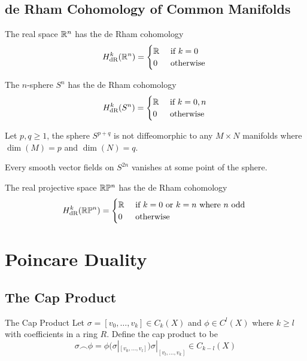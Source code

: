 \documentclass[a4paper]{article}
\begin{document}
\subsection{de Rham Cohomology of Common Manifolds}
\begin{prp}{}{} The real space $\mathbb{R}^n$ has the de Rham cohomology $$H_{\text{dR}}^k(\mathbb{R}^n)=\begin{cases}
\mathbb{R} & \text{ if }k=0\\
0 & \text{ otherwise }
\end{cases}$$
\end{prp}

\begin{prp}{}{} The $n$-sphere $S^n$ has the de Rham cohomology $$H_{\text{dR}}^k(S^n)=\begin{cases}
\mathbb{R} & \text{ if }k=0,n\\
0 & \text{ otherwise }
\end{cases}$$
\end{prp}

\begin{thm}{}{} Let $p,q\geq 1$, the sphere $S^{p+q}$ is not diffeomorphic to any $M\times N$ manifolds where $\dim(M)=p$ and $\dim(N)=q$. 
\end{thm}

\begin{prp}{}{} Every smooth vector fields on $S^{2n}$ vanishes at some point of the sphere. 
\end{prp}

\begin{prp}{}{} The real projective space $\mathbb{R}\mathbb{P}^n$ has the de Rham cohomology $$H_{\text{dR}}^k(\mathbb{R}\mathbb{P}^n)=\begin{cases}
\mathbb{R} & \text{ if }k=0\text{ or }k=n\text{ where }n\text{ odd }\\
0 & \text{ otherwise }
\end{cases}$$
\end{prp}

\pagebreak
\section{Poincare Duality}
\subsection{The Cap Product}
\begin{defn}{The Cap Product}{} Let $\sigma=[v_0,\dots,v_k]\in C_k(X)$ and $\phi\in C^l(X)$ where $k\geq l$ with coefficients in a ring $R$. Define the cap product to be $$\sigma\frown\phi=\phi(\sigma|_{[v_0,\dots,v_l]})\sigma|_{[v_l,\dots,v_k]}\in C_{k-l}(X)$$
\end{defn}
\end{document}
